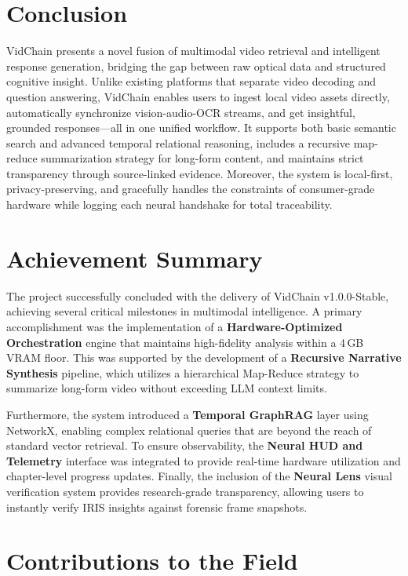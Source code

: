 \section{Conclusion}

VidChain presents a novel fusion of multimodal video retrieval and intelligent response generation, bridging the gap between raw optical data and structured cognitive insight. Unlike existing platforms that separate video decoding and question answering, VidChain enables users to ingest local video assets directly, automatically synchronize vision-audio-OCR streams, and get insightful, grounded responses---all in one unified workflow. It supports both basic semantic search and advanced temporal relational reasoning, includes a recursive map-reduce summarization strategy for long-form content, and maintains strict transparency through source-linked evidence. Moreover, the system is local-first, privacy-preserving, and gracefully handles the constraints of consumer-grade hardware while logging each neural handshake for total traceability.

\section*{Achievement Summary}

The project successfully concluded with the delivery of VidChain v1.0.0-Stable, achieving several critical milestones in multimodal intelligence. A primary accomplishment was the implementation of a \textbf{Hardware-Optimized Orchestration} engine that maintains high-fidelity analysis within a 4\,GB VRAM floor. This was supported by the development of a \textbf{Recursive Narrative Synthesis} pipeline, which utilizes a hierarchical Map-Reduce strategy to summarize long-form video without exceeding LLM context limits.

Furthermore, the system introduced a \textbf{Temporal GraphRAG} layer using NetworkX, enabling complex relational queries that are beyond the reach of standard vector retrieval. To ensure observability, the \textbf{Neural HUD and Telemetry} interface was integrated to provide real-time hardware utilization and chapter-level progress updates. Finally, the inclusion of the \textbf{Neural Lens} visual verification system provides research-grade transparency, allowing users to instantly verify IRIS insights against forensic frame snapshots.

\section{Contributions to the Field}

